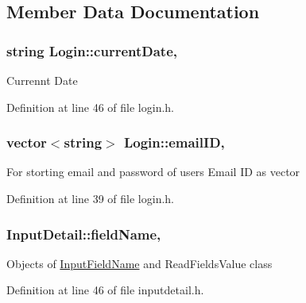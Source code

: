 \subsection{Member Data Documentation}
\hypertarget{classLogin_aac5f21425f8c63a2f40be84079c475a4}{
\subsubsection[{current\-Date}]{\setlength{\rightskip}{0pt plus 5cm}string Login\-::current\-Date\hspace{0.3cm}{\ttfamily [protected]}, {\ttfamily [inherited]}}}\label{classLogin_aac5f21425f8c63a2f40be84079c475a4}
Currennt Date 

Definition at line 46 of file login.\-h.

\hypertarget{classLogin_a3470a140651dd1afafe29f4dde99905d}{
\subsubsection[{email\-I\-D}]{\setlength{\rightskip}{0pt plus 5cm}vector$<$string$>$ Login\-::email\-I\-D\hspace{0.3cm}{\ttfamily [protected]}, {\ttfamily [inherited]}}}\label{classLogin_a3470a140651dd1afafe29f4dde99905d}
For storting email and password of users Email I\-D as vector 

Definition at line 39 of file login.\-h.

\hypertarget{classInputDetail_ac6f85380c5152c406d483726382c4798}{
\subsubsection[{field\-Name}]{ Input\-Detail\-::field\-Name\hspace{0.3cm}{\ttfamily [protected]}, {\ttfamily [inherited]}}}\label{classInputDetail_ac6f85380c5152c406d483726382c4798}
Objects of \hyperlink{classInputFieldName}{Input\-Field\-Name} and Read\-Fields\-Value class 

Definition at line 46 of file inputdetail.\-h.

